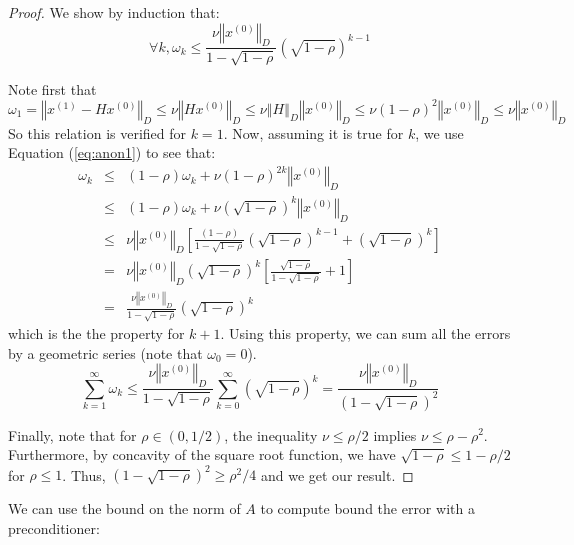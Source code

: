 \begin{proof}
We show by induction that:
\[
\forall k,\omega_{k}\leq\frac{\nu\left\Vert x^{\left(0\right)}\right\Vert _{D}}{1-\sqrt{1-\rho}}\left(\sqrt{1-\rho}\right)^{k-1}
\]


Note first that 
\[
\omega_{1}=\left\Vert x^{\left(1\right)}-Hx^{\left(0\right)}\right\Vert _{D}\leq\nu\left\Vert Hx^{\left(0\right)}\right\Vert _{D}\leq\nu\left\Vert H\right\Vert _{D}\left\Vert x^{\left(0\right)}\right\Vert _{D}\leq\nu\left(1-\rho\right)^{2}\left\Vert x^{\left(0\right)}\right\Vert _{D}\leq\nu\left\Vert x^{\left(0\right)}\right\Vert _{D}
\]
So this relation is verified for $k=1$. Now, assuming it is true
for $k$, we use Equation (\ref{eq:anon1}) to see that:
\begin{eqnarray*}
\omega_{k} & \leq & \left(1-\rho\right)\omega_{k}+\nu\left(1-\rho\right)^{2k}\left\Vert x^{\left(0\right)}\right\Vert _{D}\\
 & \leq & \left(1-\rho\right)\omega_{k}+\nu\left(\sqrt{1-\rho}\right)^{k}\left\Vert x^{\left(0\right)}\right\Vert _{D}\\
 & \leq & \nu\left\Vert x^{\left(0\right)}\right\Vert _{D}\left[\frac{\left(1-\rho\right)}{1-\sqrt{1-\rho}}\left(\sqrt{1-\rho}\right)^{k-1}+\left(\sqrt{1-\rho}\right)^{k}\right]\\
 & = & \nu\left\Vert x^{\left(0\right)}\right\Vert _{D}\left(\sqrt{1-\rho}\right)^{k}\left[\frac{\sqrt{1-\rho}}{1-\sqrt{1-\rho}}+1\right]\\
 & = & \frac{\nu\left\Vert x^{\left(0\right)}\right\Vert _{D}}{1-\sqrt{1-\rho}}\left(\sqrt{1-\rho}\right)^{k}
\end{eqnarray*}
which is the the property for $k+1$. Using this property, we can
sum all the errors by a geometric series (note that $\omega_{0}=0$).
\[
\sum_{k=1}^{\infty}\omega_{k}\leq\frac{\nu\left\Vert x^{\left(0\right)}\right\Vert _{D}}{1-\sqrt{1-\rho}}\sum_{k=0}^{\infty}\left(\sqrt{1-\rho}\right)^{k}=\frac{\nu\left\Vert x^{\left(0\right)}\right\Vert _{D}}{\left(1-\sqrt{1-\rho}\right)^{2}}
\]


Finally, note that for $\rho\in\left(0,1/2\right)$, the inequality
$\nu\leq\rho/2$ implies $\nu\leq\rho-\rho^{2}$. Furthermore, by
concavity of the square root function, we have $\sqrt{1-\rho}\leq1-\rho/2$
for $\rho\leq1$. Thus, $\left(1-\sqrt{1-\rho}\right)^{2}\geq\rho^{2}/4$
and we get our result.

\end{proof}

We can use the bound on the norm of $A$ to compute bound the error
with a preconditioner:

